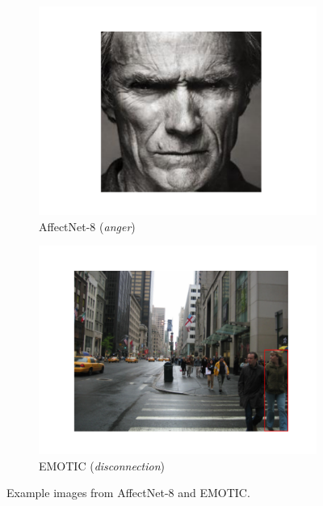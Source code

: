 \begin{figure}[t]
\centering
\hspace{-1cm}
\begin{subfigure}{0.6\linewidth}
  \includegraphics[width=\linewidth]{pictures/affectnet/example_image.pdf} 
    \caption{AffectNet-8 (\textit{anger})}
    \label{body}
    \end{subfigure} \hspace{-1cm}
\begin{subfigure}{0.6\linewidth}
    \includegraphics[width=\linewidth]{pictures/emotic/example_image.pdf}
        \caption{EMOTIC (\textit{disconnection})}
    \end{subfigure}
    \caption{Example images from AffectNet-8 and EMOTIC.}
    \label{fig:example-imgs}
\end{figure}


